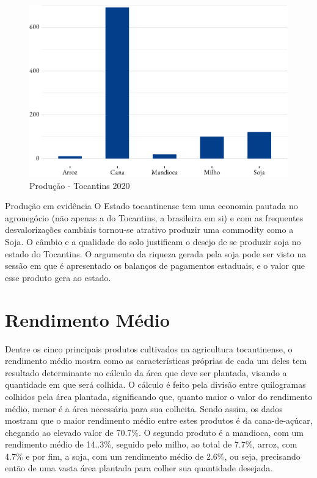 \begin{figure}[h]
	\caption{Produção - Tocantins 2020}
	\includegraphics{fig/producao-1.pdf}
\end{figure}

\begin{smbox}[label={labelbox},nameref={Agricultura}]{Produção em evidência}
	O Estado tocantinense tem uma economia pautada no agronegócio (não apenas a do Tocantins, a brasileira em si) e com as frequentes desvalorizações cambiais tornou-se atrativo produzir uma commodity como a Soja. O câmbio e a qualidade do solo justificam o desejo de se produzir soja no  estado do Tocantins. O argumento da riqueza gerada pela soja pode ser visto na sessão em que é apresentado os balanços de pagamentos estaduais, e o valor que esse produto gera ao estado.
\end{smbox}

\section{Rendimento Médio}
\par Dentre os cinco principais produtos cultivados na agricultura tocantinense, o rendimento médio mostra como as características próprias de cada um deles tem resultado determinante no cálculo da área que deve ser plantada, visando a quantidade em que será colhida. O cálculo é feito pela divisão entre quilogramas colhidos pela área plantada, significando que, quanto maior o valor do rendimento médio, menor é a área necessária para sua colheita. Sendo assim, os dados mostram que o maior rendimento médio entre estes produtos é da cana-de-açúcar, chegando ao elevado valor de 70.7\%. O segundo produto é a mandioca, com um rendimento médio de 14..3\%, seguido pelo milho, ao total de 7.7\%, arroz, com 4.7\% e por fim, a soja, com um rendimento médio de 2.6\%, ou seja, precisando então de uma vasta área plantada para colher sua quantidade desejada. 


